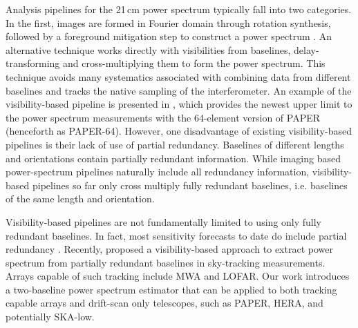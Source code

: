 \documentclass[twocolumn,apj,numberedappendix]{emulateapj}
\renewcommand\[{\begin{equation}}
\renewcommand\]{\end{equation}}
\begin{document}
Analysis pipelines for the 21\,cm power spectrum typically fall into two categories. In the first, images are formed in Fourier domain through rotation synthesis, followed by a foreground mitigation step to construct a power spectrum \citep{LOFARresult, MWAresult1, MWAresult0}. An alternative technique works directly with visibilities from baselines, delay-transforming and cross-multiplying them to form the power spectrum. This technique avoids many systematics associated with combining data from different baselines and tracks the native sampling of the interferometer. An example of the visibility-based pipeline is presented in \cite{Ali2015}, which provides the newest upper limit to the power spectrum
measurements with the 64-element version of PAPER (henceforth as PAPER-64). However, one disadvantage of existing visibility-based pipelines is their lack of use of partial redundancy. Baselines of different lengths and orientations contain partially redundant information. While imaging based power-spectrum pipelines naturally include all redundancy information, visibility-based pipelines so far only cross multiply fully redundant baselines, i.e. baselines of the same length and orientation.

Visibility-based pipelines are not fundamentally limited to using only fully redundant baselines. In fact, most sensitivity forecasts to date do include partial redundancy \citep{Pobersens, HERA, JoshAntPos}. Recently, \cite{wterm} proposed a visibility-based approach to extract power spectrum from partially redundant baselines in sky-tracking measurements. Arrays capable of such tracking include MWA and LOFAR. Our work introduces a two-baseline power spectrum estimator that can be applied to both tracking capable arrays and drift-scan only telescopes, such as PAPER, HERA, and potentially SKA-low.
\end{document}
